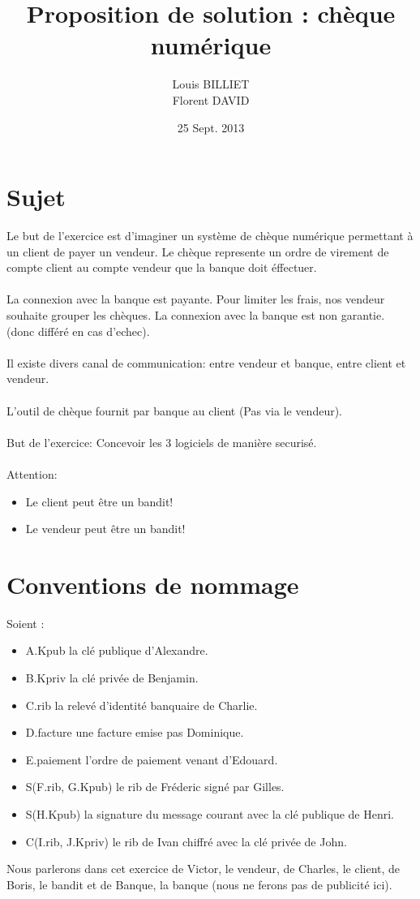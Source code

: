 \documentclass[oneside,10pt]{article}
\begin{document}
\title{Proposition de solution : ch\`eque num\'erique}
\author{Louis BILLIET \\ Florent DAVID}
\date{25 Sept. 2013}
\maketitle

\section{Sujet}
Le but de l'exercice est d'imaginer un syst\`eme de ch\`eque num\'erique permettant \`a un client de payer un vendeur.
Le ch\`eque represente un ordre de virement de compte client au compte vendeur que la banque doit \'effectuer.
\\
\\
La connexion avec la banque est payante. Pour limiter les frais, nos vendeur souhaite grouper les ch\`eques. 
La connexion avec la banque est non garantie. (donc diff\'er\'e en cas d'echec).
\\
\\
Il existe divers canal de communication: entre vendeur et banque, entre client et vendeur.
\\
\\
L'outil de ch\`eque fournit par banque au client (Pas via  le vendeur).
\\
\\
But de l'exercice: Concevoir les 3 logiciels de mani\`ere securis\'e.
\\
\\
Attention:
\begin{itemize}
  \item Le client peut \^etre un bandit!
  \item Le vendeur peut \^etre un bandit!
\end{itemize}

\section{Conventions de nommage}
Soient :
\begin{itemize}
\item A.Kpub la cl\'e publique d'Alexandre.
\item B.Kpriv la cl\'e priv\'ee de Benjamin.
\item C.rib la relev\'e d'identit\'e banquaire de Charlie.
\item D.facture une facture emise pas Dominique.
\item E.paiement l'ordre de paiement venant d'Edouard.
\item S(F.rib, G.Kpub) le rib de Fr\'ederic sign\'e par Gilles.
\item S(H.Kpub) la signature du message courant avec la cl\'e publique de Henri.
\item C(I.rib, J.Kpriv) le rib de Ivan chiffr\'e avec la cl\'e priv\'ee de John.
\end{itemize}
Nous parlerons dans cet exercice de Victor, le vendeur, de Charles, le client, de Boris, le bandit et de Banque, la banque (nous ne ferons pas de publicit\'e ici).
\end{document}
